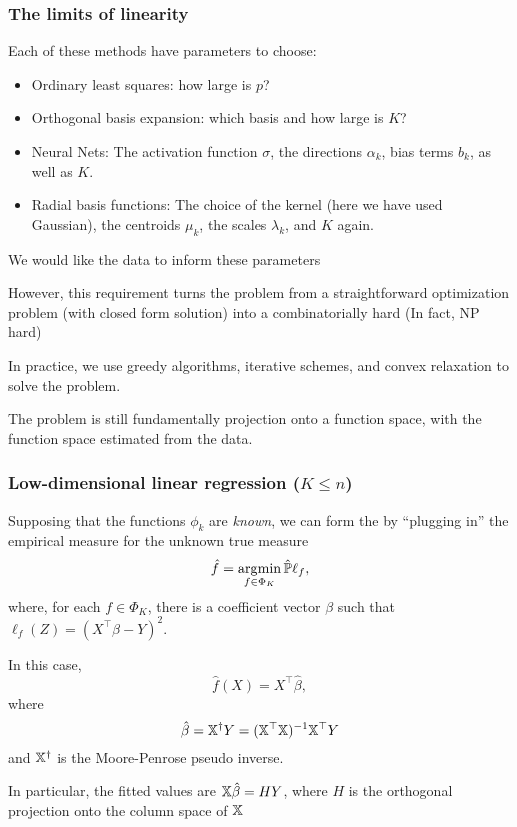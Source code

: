 \documentclass{beamer}
\begin{document}
\begin{frame}
\frametitle{The limits of linearity}
Each of these methods have parameters to choose:
\begin{itemize}
\item Ordinary least squares: how large is $p$?
\item Orthogonal basis expansion: which basis and how large is $K$?
\item Neural Nets: The activation function $\sigma$, the directions $\alpha_k$,  bias terms $b_k$, as well as $K$.
\item Radial basis functions: The choice of the kernel (here we have used Gaussian), the centroids $\mu_k$, 
the scales $\lambda_k$, and $K$ again.
\end{itemize}

\vsp
We would like the data to inform these parameters

\vsp
However, this requirement turns the problem from a straightforward 
optimization problem (with closed form solution) into a combinatorially hard  (In fact, NP hard)

\vsp
 In practice, we use greedy algorithms, iterative schemes, and convex relaxation to solve the
  problem. 
 
 \vsp
  The  problem is still fundamentally projection
 onto a function space, with the function space estimated from the data.
\end{frame}

\begin{frame}
\frametitle{Low-dimensional linear regression ($K \leq n$)}
Supposing that the functions $\phi_k$ are {\it known}, 
we can form the  by
``plugging in'' the empirical measure for the unknown true measure
\[
\hat{f}= \operatorname*{\arg\!\min}_{f \in \Phi_K} \hat{\mathbb{P}}\ell_f,
\]
where, for each  $f \in \Phi_K$, there is a coefficient vector $\beta$ such that 
$\ell_f(Z) = (X^{\top}\beta - Y)^2$.
\vsp

In this case, 
\[
\hat{f}(X) = X^{\top} \hat \beta,
\]
where 
\[
\hat\beta = \mathbb{X}^{\dagger}Y = (\mathbb{X}^{\top} \mathbb{X})^{-1} \mathbb{X}^{\top} Y
\]
and $\mathbb{X}^{\dagger}$ is the Moore-Penrose pseudo inverse\note.

\vsp
In particular, the fitted values are $\mathbb{X}\hat\beta = H Y$, where $H$ is the orthogonal projection onto the 
column space of $\mathbb{X}$
\end{frame}
\end{document}
